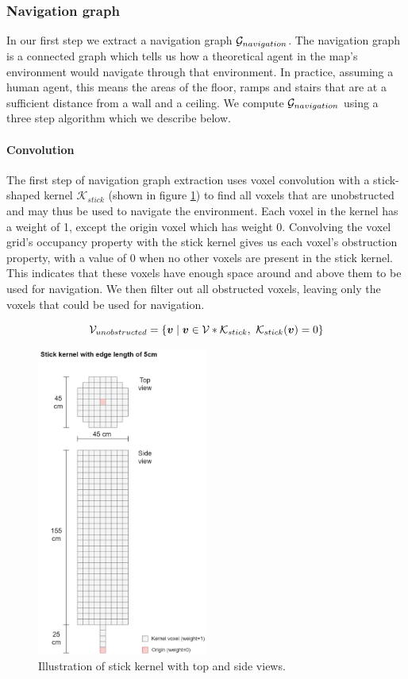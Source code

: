 \subsubsection{Navigation graph}
In our first step we extract a navigation graph \(\mathcal{G}_{navigation}\). The navigation graph is a connected graph which tells us how a theoretical agent in the map's environment would navigate through that environment. In practice, assuming a human agent, this means the areas of the floor, ramps and stairs that are at a sufficient distance from a wall and a ceiling. We compute \(\mathcal{G}_{navigation}\) using a three step algorithm which we describe below.

\paragraph{Convolution}
The first step of navigation graph extraction uses voxel convolution with a stick-shaped kernel \(\mathcal{K}_{stick}\) (shown in figure \ref{fig:stick_kernel}) to find all voxels that are unobstructed and may thus be used to navigate the environment. Each voxel in the kernel has a weight of 1, except the origin voxel which has weight 0. Convolving the voxel grid's occupancy property with the stick kernel gives us each voxel's obstruction property, with a value of 0 when no other voxels are present in the stick kernel. This indicates that these voxels have enough space around and above them to be used for navigation. We then filter out all obstructed voxels, leaving only the voxels that could be used for navigation.

\begin{equation}
    \label{eq:convolve}
\mathcal{V}_{unobstructed}=\{\boldsymbol{v} \mid \boldsymbol{v} \in \mathcal{V} * \mathcal{K}_{stick},\ \mathcal{K}_{stick}(\boldsymbol{v}) = 0\}
\end{equation}

\begin{figure}[h]
    \centering
    \includegraphics*[width=0.5\textwidth]{./fig/structuring_element.png}
    \caption{Illustration of stick kernel with top and side views.}
    \label{fig:stick_kernel}
\end{figure}

